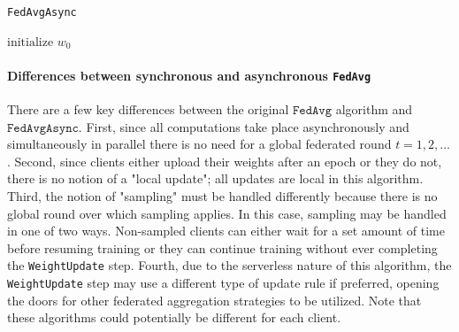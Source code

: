 \documentclass[twocolumn, switch]{article} %
\begin{document}
\begin{algorithm}
    \caption{\texttt{FedAvgAsync}}\label{alg:afedavg}
    $\text{initialize } w_0$\;
    
\end{algorithm}

\paragraph{Differences between synchronous and asynchronous \texttt{FedAvg}}

There are a few key differences between the original $\texttt{FedAvg}$ algorithm and $\texttt{FedAvgAsync}$. First, since all computations take place asynchronously and simultaneously in parallel there is no need for a global federated round $t = 1,2, \dots$. Second, since clients either upload their weights after an epoch or they do not, there is no notion of a "local update"; all updates are local in this algorithm. Third, the notion of "sampling" must be handled differently because there is no global round over which sampling applies. In this case, sampling may be handled in one of two ways. Non-sampled clients can either wait for a set amount of time before resuming training or they can continue training without ever completing the \texttt{WeightUpdate} step. Fourth, due to the serverless nature of this algorithm, the \texttt{WeightUpdate} step may use a different type of update rule if preferred, opening the doors for other federated aggregation strategies to be utilized. Note that these algorithms could potentially be different for each client.
\end{document}
